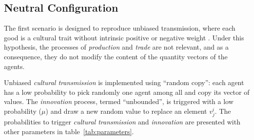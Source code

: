 \documentclass{wscpaperproc}
\begin{document}

\subsection{Neutral Configuration}\label{sec:culturalTrans}

The first scenario is designed to reproduce unbiased transmission, where each good is a cultural trait without intrinsic positive or negative weight \cite{bentley_random_2004,bentley_specialisation_2005,mesoudi_random_2009}. 
Under this hypothesis, the processes of \emph{production} and \emph{trade} are not relevant, and as a consequence, they do not modify the content of the quantity vectors of the agents.

Unbiased \emph{cultural transmission} is implemented using ``random copy'': each agent has a low probability to pick randomly one agent among all and copy its vector of values. The \emph{innovation} process, termed ``unbounded'', is triggered with a low probability ($\mu$) and draw a new random value to replace an element $v^i_j$. The probabilities to trigger \emph{cultural transmission} and \emph{innovation} are presented with other parameters in table~\ref{tab:parameters}.
\end{document}
